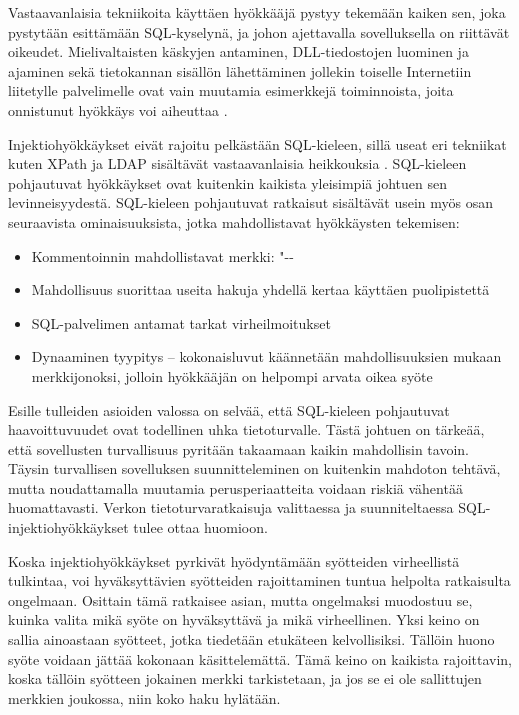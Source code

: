 Vastaavanlaisia tekniikoita käyttäen hyökkääjä pystyy tekemään kaiken sen, joka pystytään esittämään SQL-kyselynä, ja johon ajettavalla
sovelluksella on riittävät oikeudet. Mielivaltaisten käskyjen antaminen, DLL-tiedostojen luominen ja ajaminen sekä tietokannan
sisällön lähettäminen jollekin toiselle Internetiin liitetylle palvelimelle ovat vain muutamia esimerkkejä toiminnoista, joita
onnistunut hyökkäys voi aiheuttaa \cite{SQLSS}.

Injektiohyökkäykset eivät rajoitu pelkästään SQL-kieleen, sillä useat eri tekniikat kuten XPath ja LDAP sisältävät vastaavanlaisia 
heikkouksia \cite{WEB2}. SQL-kieleen pohjautuvat hyökkäykset ovat kuitenkin kaikista yleisimpiä johtuen sen levinneisyydestä. SQL-kieleen
pohjautuvat ratkaisut sisältävät usein myös osan seuraavista ominaisuuksista, jotka mahdollistavat hyökkäysten tekemisen:

\begin{itemize}
\item Kommentoinnin mahdollistavat merkki: "{-}{-}
\item Mahdollisuus suorittaa useita hakuja yhdellä kertaa käyttäen puolipistettä
\item SQL-palvelimen antamat tarkat virheilmoitukset
\item Dynaaminen tyypitys -- kokonaisluvut käännetään mahdollisuuksien mukaan merkkijonoksi, jolloin hyökkääjän
             on helpompi arvata oikea syöte \cite{SQLSS}
\end{itemize}


Esille tulleiden asioiden valossa on selvää, että SQL-kieleen pohjautuvat haavoittuvuudet ovat todellinen uhka tietoturvalle.
Tästä johtuen on tärkeää, että sovellusten turvallisuus pyritään takaamaan kaikin mahdollisin tavoin. Täysin turvallisen sovelluksen 
suunnitteleminen on kuitenkin mahdoton tehtävä, mutta noudattamalla muutamia perusperiaatteita voidaan riskiä vähentää huomattavasti.
Verkon tietoturvaratkaisuja valittaessa ja suunniteltaessa
SQL-injektiohyökkäykset tulee ottaa huomioon.

Koska injektiohyökkäykset pyrkivät hyödyntämään syötteiden
virheellistä tulkintaa, voi hyväksyttävien syötteiden rajoittaminen
tuntua helpolta ratkaisulta ongelmaan. Osittain tämä ratkaisee asian,
mutta ongelmaksi muodostuu se, kuinka valita mikä syöte on
hyväksyttävä ja mikä virheellinen. Yksi keino on sallia ainoastaan
syötteet, jotka tiedetään etukäteen kelvollisiksi. Tällöin huono syöte
voidaan jättää kokonaan käsittelemättä. Tämä keino on kaikista
rajoittavin, koska tällöin syötteen jokainen merkki tarkistetaan, ja
jos se ei ole sallittujen merkkien joukossa, niin koko haku
hylätään.

